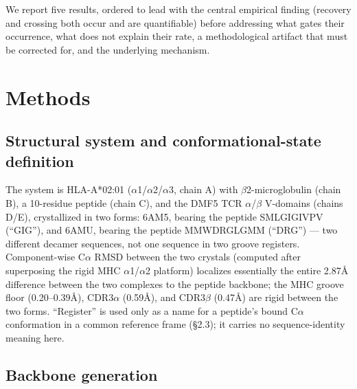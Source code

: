 \documentclass[letterpaper]{article}
\begin{document}
We report five results, ordered to lead with the central empirical finding (recovery and crossing both
occur and are quantifiable) before addressing what gates their occurrence, what does not explain their
rate, a methodological artifact that must be corrected for, and the underlying mechanism.

\section{Methods}

\subsection{Structural system and conformational-state definition}

The system is HLA-A*02:01 ($\alpha$1/$\alpha$2/$\alpha$3, chain A) with $\beta$2-microglobulin (chain B), a
10-residue peptide (chain C), and the DMF5 TCR $\alpha$/$\beta$ V-domains (chains D/E), crystallized in two
forms: 6AM5, bearing the peptide SMLGIGIVPV (``GIG''), and 6AMU, bearing the peptide MMWDRGLGMM (``DRG'')
--- two different decamer sequences, not one sequence in two groove registers. Component-wise C$\alpha$
RMSD between the two crystals (computed after superposing the rigid MHC $\alpha$1/$\alpha$2 platform)
localizes essentially the entire 2.87\AA{} difference between the two complexes to the peptide backbone;
the MHC groove floor (0.20--0.39\AA{}), CDR3$\alpha$ (0.59\AA{}), and CDR3$\beta$ (0.47\AA{}) are rigid
between the two forms. ``Register'' is used only as a name for a peptide's bound C$\alpha$ conformation in
a common reference frame (\S2.3); it carries no sequence-identity meaning here.

\subsection{Backbone generation}
\end{document}
